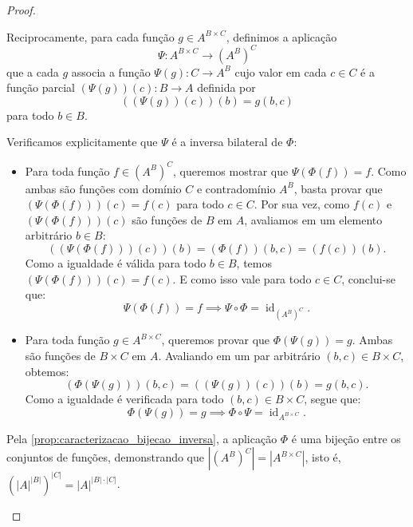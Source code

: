 \begin{proof}
\begin{enumerate}
              Reciprocamente, para cada função \(g \in A^{B \times C}\), definimos a aplicação
              \[
                  \Psi: A^{B \times C} \to (A^B)^C
              \]
              que a cada \(g\) associa a função \(\Psi(g): C \to A^B\) cujo valor em cada \(c \in C\) é a função parcial \((\Psi(g))(c): B \to A\) definida por
              \[
                  ((\Psi(g))(c))(b) = g(b, c)
              \]
              para todo \(b \in B\).

              Verificamos explicitamente que \(\Psi\) é a inversa bilateral de \(\Phi\):
              \begin{itemize}
                  \item Para toda função \(f \in (A^B)^C\), queremos mostrar que \(\Psi(\Phi(f)) = f\). Como ambas são funções com domínio \(C\) e contradomínio \(A^B\), basta provar que \((\Psi(\Phi(f)))(c) = f(c)\) para todo \(c \in C\). Por sua vez, como \(f(c)\) e \((\Psi(\Phi(f)))(c)\) são funções de \(B\) em \(A\), avaliamos em um elemento arbitrário \(b \in B\):
                        \[
                            ((\Psi(\Phi(f)))(c))(b) = (\Phi(f))(b, c) = (f(c))(b).
                        \]
                        Como a igualdade é válida para todo \(b \in B\), temos \((\Psi(\Phi(f)))(c) = f(c)\). E como isso vale para todo \(c \in C\), conclui-se que:
                        \[
                            \Psi(\Phi(f)) = f \implies \Psi \circ \Phi = \operatorname{id}_{(A^B)^C}.
                        \]
                  \item Para toda função \(g \in A^{B \times C}\), queremos provar que \(\Phi(\Psi(g)) = g\). Ambas são funções de \(B \times C\) em \(A\). Avaliando em um par arbitrário \((b, c) \in B \times C\), obtemos:
                        \[
                            (\Phi(\Psi(g)))(b, c) = ((\Psi(g))(c))(b) = g(b, c).
                        \]
                        Como a igualdade é verificada para todo \((b, c) \in B \times C\), segue que:
                        \[
                            \Phi(\Psi(g)) = g \implies \Phi \circ \Psi = \operatorname{id}_{A^{B \times C}}.
                        \]
              \end{itemize}
              Pela \autoref{prop:caracterizacao_bijecao_inversa}, a aplicação \(\Phi\) é uma bijeção entre os conjuntos de funções, demonstrando que \(|(A^B)^C| = |A^{B \times C}|\), isto é, \((|A|^{|B|})^{|C|} = |A|^{|B| \cdot |C|}\).


\end{enumerate}
\end{proof}
